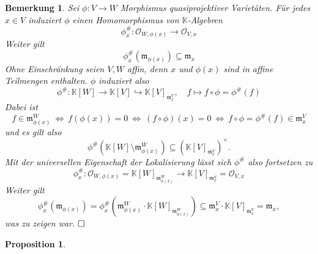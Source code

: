 \documentclass[11pt]{book}
\newtheorem{prop}[theorem]{Proposition}
\newtheorem{remark}[theorem]{Bemerkung}
\theoremstyle{nonumberbreak}
\newenvironment{pr}[1][]{\ifthenelse{\equal{#1}{}}{\proof}{\proof[#1]}\rm}{\endproof}
\begin{document}
\begin{spacing}{1.3}
\begin{remark} %

Sei $\phi:V \longrightarrow W$ Morphismus quasiprojektiver Varietäten. Für jedes $x \in V$ induziert $\phi$ einen Homomorphismus von $\mathbb{K}$-Algebren
$$\phi_x^\# : \mathcal{O}_{W, \phi(x)} \longrightarrow \mathcal{O}_{V,x}$$
Weiter gilt
$$\phi_x^\#\left(\mathfrak{m}_{\phi(x)}\right) \subseteq \mathfrak{m}_x$$
\begin{pr}
Ohne Einschränkung seien $V,W$ affin, denn $x$ und $\phi(x)$ sind in affine Teilmengen enthalten. $\phi$ induziert also 
$$\phi^\#: \mathbb{K}[W] \longrightarrow \mathbb{K}[V] \hookrightarrow \mathbb{K}[V]_{\mathfrak{m}_x^{V}}, \quad f \mapsto f \circ \phi = \phi^\#(f)$$
Dabei ist
$$f \in \mathfrak{m}_{\phi(x)}^W \ \Longleftrightarrow \ f(\phi(x))=0 \ \Longleftrightarrow \ (f \circ \phi)(x)=0 \ \Longleftrightarrow \ f \circ \phi = \phi^{\#} (f) \in \mathfrak{m}_x^V$$
und es gilt also $$\phi^{\#} \left(\mathbb{K}[W] \setminus \mathfrak{m}_{\phi(x)}^{W}\right) \subseteq \left(\mathbb{K}[V]_{\mathfrak{m}_x^{V}} \right)^{\times}.$$
Mit der universellen Eigenschaft der Lokalisierung lässt sich $\phi^{\#}$ also fortsetzen zu 
$$\phi^\#_x: \mathcal{O}_{W, \phi(x)} = \mathbb{K}[W]_{\mathfrak{m}_{\phi(x)}^W} \longrightarrow \mathbb{K}[V]_{\mathfrak{m}_x^V} = \mathcal{O}_{V,x}$$
Weiter gilt
$$\phi_x^\#(\mathfrak{m}_{\phi(x)}) = \phi_x^\# \left( \mathfrak{m}_{\phi(x)}^W \cdot \mathbb{K}[W]_{\mathfrak{m}_{\phi(x)}^W}\right) \subseteq \mathfrak{m}_x^V \cdot \mathbb{K}[V]_{\mathfrak{m}_x^V} = \mathfrak{m}_x,$$
was zu zeigen war. $\hfill \Box$
\end{pr}
\end{remark}

\begin{prop} %


\end{prop}
\end{spacing}
\end{document}
